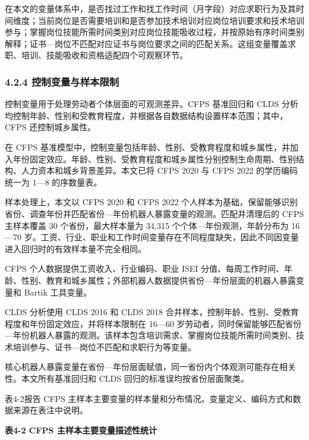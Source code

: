 在本文的变量体系中，是否找过工作和找工作时间（月字段）对应求职行为及其时间维度；当前岗位是否需要培训和是否参加技术培训对应岗位培训要求和技术培训参与；掌握岗位技能所需时间类别对应岗位技能吸收过程，并按原始有序时间类别解释；证书---岗位不匹配对应证书与岗位要求之间的匹配关系。这组变量覆盖求职、培训、技能吸收和资格适配四个可观察环节。

\subsubsection{4.2.4 控制变量与样本限制}\label{ux63a7ux5236ux53d8ux91cfux4e0eux6837ux672cux9650ux5236}

控制变量用于处理劳动者个体层面的可观测差异。CFPS 基准回归和 CLDS 分析均控制年龄、性别和受教育程度，并根据各自数据结构设置样本范围；其中，CFPS 还控制城乡属性。

在 CFPS 基准模型中，控制变量包括年龄、性别、受教育程度和城乡属性，并加入年份固定效应。年龄、性别、受教育程度和城乡属性分别控制生命周期、性别结构、人力资本和城乡背景差异。本文已将 CFPS 2020 与 CFPS 2022 的学历编码统一为 1---8 的序数量表。

样本处理上，本文以 CFPS 2020 和 CFPS 2022 个人样本为基础，保留能够识别省份、调查年份并匹配省份---年份机器人暴露变量的观测。匹配并清理后的 CFPS 主样本覆盖 30 个省份，最大样本量为 34,315 个个体---年份观测，年龄分布为 16---70 岁。工资、行业、职业和工作时间变量存在不同程度缺失，因此不同因变量进入回归时的有效样本量不完全相同。

CFPS 个人数据提供工资收入、行业编码、职业 ISEI 分值、每周工作时间、年龄、性别、教育和城乡属性；外部机器人数据提供省份---年份层面的机器人暴露变量和 Bartik 工具变量。

CLDS 分析使用 CLDS 2016 和 CLDS 2018 合并样本，控制年龄、性别、受教育程度和年份固定效应，并将样本限制在 16---60 岁劳动者，同时保留能够匹配省份---年份机器人暴露的观测。该样本包含培训需求、掌握岗位技能所需时间类别、技术培训参与、证书---岗位不匹配和求职行为等变量。

核心机器人暴露变量在省份---年份层面赋值，同一省份内个体观测可能存在相关性。本文所有基准回归和 CLDS 回归的标准误均按省份层面聚类。

表4-2报告 CFPS 主样本主要变量的样本量和分布情况。变量定义、编码方式和数据来源在表注中说明。

\textbf{表4-2 CFPS 主样本主要变量描述性统计}

